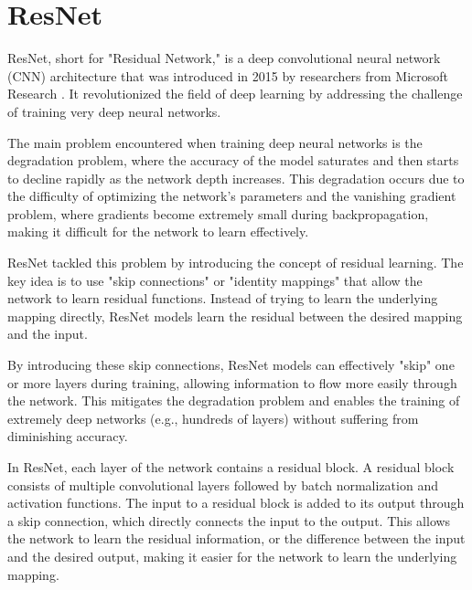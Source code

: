 \newpage

\section{ResNet}

ResNet, short for "Residual Network," is a deep convolutional neural network
(CNN) architecture that was introduced in 2015 by researchers from Microsoft
Research \cite{ResNetPaper}. It revolutionized the field of deep learning by
addressing the challenge of training very deep neural networks. \newline

The main problem encountered when training deep neural networks is the
degradation problem, where the accuracy of the model saturates and then starts
to decline rapidly as the network depth increases. This degradation occurs due
to the difficulty of optimizing the network's parameters and the vanishing
gradient problem, where gradients become extremely small during
backpropagation, making it difficult for the network to learn effectively.
\newline

ResNet tackled this problem by introducing the concept of residual learning.
The key idea is to use "skip connections" or "identity mappings" that allow the
network to learn residual functions. Instead of trying to learn the underlying
mapping directly, ResNet models learn the residual between the desired mapping
and the input. \newline

By introducing these skip connections, ResNet models can effectively "skip" one
or more layers during training, allowing information to flow more easily
through the network. This mitigates the degradation problem and enables the
training of extremely deep networks (e.g., hundreds of layers) without
suffering from diminishing accuracy. \newline

In ResNet, each layer of the network contains a residual block. A residual
block consists of multiple convolutional layers followed by batch normalization
and activation functions. The input to a residual block is added to its output
through a skip connection, which directly connects the input to the output.
This allows the network to learn the residual information, or the difference
between the input and the desired output, making it easier for the network to
learn the underlying mapping.  \newline

